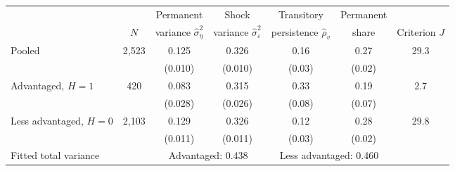 \setlength{\tabcolsep}{4pt}
\begin{tabular}{@{}lcccccc@{}}
\toprule
& & Permanent & Shock & Transitory & Permanent & \\
& $N$ & variance $\hat\sigma^2_\eta$ & variance $\hat\sigma^2_\varepsilon$ & persistence $\hat\rho_v$ & share & Criterion $J$ \\
\midrule
Pooled & 2,523 & 0.125 & 0.326 & 0.16 & 0.27 & 29.3 \\
 &  & (0.010) & (0.010) & (0.03) & (0.02) &  \\
Advantaged, $H=1$ & 420 & 0.083 & 0.315 & 0.33 & 0.19 & 2.7 \\
 &  & (0.028) & (0.026) & (0.08) & (0.07) &  \\
Less advantaged, $H=0$ & 2,103 & 0.129 & 0.326 & 0.12 & 0.28 & 29.8 \\
 &  & (0.011) & (0.011) & (0.03) & (0.02) &  \\
\addlinespace
Fitted total variance &  & \multicolumn{2}{c}{Advantaged: 0.438} & \multicolumn{2}{c}{Less advantaged: 0.460} &  \\
\bottomrule
\end{tabular}
